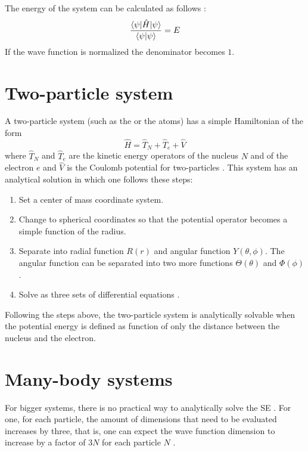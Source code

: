 \documentclass[../master_thesis.tex]{subfiles}
\begin{document}
The energy of the system can be calculated as follows \cite{Cramer:2004}:
\begin{equation}\label{eq:endevaleq}
  \frac{\braket{\psi|\hat{H}|\psi}}{\braket{\psi|\psi}} = E
\end{equation}
If the wave function is normalized the denominator becomes $1$.

\section{Two-particle system}
A two-particle system (such as the  or the  atoms) has a simple
Hamiltonian of the form
\begin{equation}
  \hat{H}=\hat{T}_{N}+\hat{T}_{e}+\hat{V}
\end{equation}
where $\hat{T}_N$ and $\hat{T}_e$ are the kinetic energy operators of the nucleus $N$ and
of the electron $e$ and $\hat{V}$ is the Coulomb potential for two-particles
\cite{Atkins:2014, Jensen:2017}.
This system has an analytical solution in which one follows these steps:
\begin{enumerate}
  \item Set a center of mass coordinate system.
  \item Change to spherical coordinates so that the potential operator becomes a
  simple function of the radius.
  \item Separate into radial function $R(r)$ and angular function
  $Y(\theta, \phi)$. The angular function can be separated into two more
  functions $\Theta(\theta)$ and $\Phi(\phi)$.
  \item Solve as three sets of differential equations \cite{Simons:2016}.
\end{enumerate}
Following the steps above, the two-particle system is analytically solvable when
the potential energy is defined as function of only the distance between the
nucleus and the electron.

\section{Many-body systems}

For bigger systems, there is no practical way to analytically solve the
\ac{SE} \cite{Jensen:2017}. For one, for each particle, the amount of dimensions that need to be
evaluated increases by three, that is, one can expect the wave function
dimension to increase by a factor of $3N$ for each particle $N$
\cite{Cramer:2004}.
\end{document}
